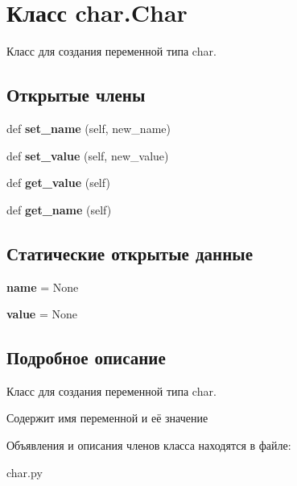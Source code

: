 \hypertarget{classchar_1_1_char}{}\section{Класс char.\+Char}
\label{classchar_1_1_char}


Класс для создания переменной типа char.  


\subsection*{Открытые члены}
\begin{DoxyCompactItemize}
\item 
\mbox{\label{classchar_1_1_char_ac9b1324980723d4609cd5a235c210f1c}} 
def {\bfseries set\+\_\+name} (self, new\+\_\+name)
\item 
\mbox{\label{classchar_1_1_char_a1e669ba9d96d869232937f3152fada71}} 
def {\bfseries set\+\_\+value} (self, new\+\_\+value)
\item 
\mbox{\label{classchar_1_1_char_a10794383adf1eb71150e6fbdc1a2e8eb}} 
def {\bfseries get\+\_\+value} (self)
\item 
\mbox{\label{classchar_1_1_char_a9d5fce44aa496970b929640368dce080}} 
def {\bfseries get\+\_\+name} (self)
\end{DoxyCompactItemize}
\subsection*{Статические открытые данные}
\begin{DoxyCompactItemize}
\item 
\mbox{\label{classchar_1_1_char_a791c3522c7d321a22878913058f29a65}} 
{\bfseries name} = None
\item 
\mbox{\label{classchar_1_1_char_a8880b93b6f62db4f8d2a92c58c2a3a4a}} 
{\bfseries value} = None
\end{DoxyCompactItemize}


\subsection{Подробное описание}
Класс для создания переменной типа char. 

Содержит имя переменной и её значение 

Объявления и описания членов класса находятся в файле\+:\begin{DoxyCompactItemize}
\item 
char.\+py\end{DoxyCompactItemize}
